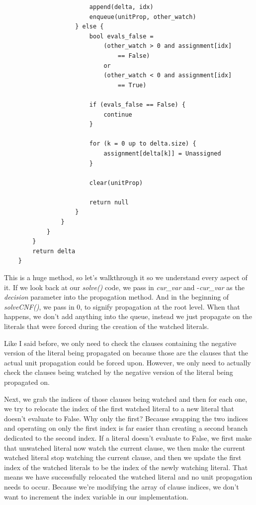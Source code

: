 \documentclass[oneside]{book}
\begin{document}
\begin{lstlisting}
                        append(delta, idx)
                        enqueue(unitProp, other_watch)
                    } else {
                        bool evals_false =
                            (other_watch > 0 and assignment[idx] 
                                == False) 
                            or
                            (other_watch < 0 and assignment[idx] 
                                == True)

                        if (evals_false == False) {
                            continue
                        }

                        for (k = 0 up to delta.size) {
                            assignment[delta[k]] = Unassigned
                        }

                        clear(unitProp)

                        return null
                    }
                }
            }
        }
        return delta
    }
\end{lstlisting}

This is a huge method, so let's walkthrough it so we understand every aspect of it. 
If we look back at our \textit{solve()} code, we pass in \textit{cur\_var} and 
-\textit{cur\_var} as the \textit{decision} parameter into the propagation method. 
And in the beginning of \textit{solveCNF()}, we pass in $0$, to signify propagation at the 
root level. When that happens, we don't add anything into the queue, instead we just propagate 
on the literals that were forced during the creation of the watched literals. 

Like I said before, we only need to check the clauses containing the negative version of the 
literal being propagated on because those are the clauses that the actual unit propagation could 
be forced upon. However, we only need to actually check the clauses being watched by the negative 
version of the literal being propagated on. 

Next, we grab the indices of those clauses being watched and then for each one, we try 
to relocate the index of the first watched literal to a new literal that doesn't evaluate 
to False. Why only the first? Because swapping the two indices and operating on only the 
first index is far easier than creating a second branch dedicated to the second index.
If a literal doesn't evaluate to False, we first make that unwatched literal now watch 
the current clause, we then make the current watched literal stop watching the current clause,
and then we update the first index of the watched literals to be the index of the newly 
watching literal. That means we have successfully relocated the watched literal and no 
unit propagation needs to occur. Because we're modifying the array of clause indices, 
we don't want to increment the index variable in our implementation.
\end{document}
